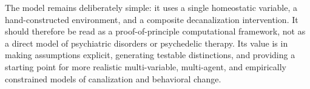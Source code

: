 The model remains deliberately simple: it uses a single homeostatic variable, a hand-constructed environment, and a composite decanalization intervention. It should therefore be read as a proof-of-principle computational framework, not as a direct model of psychiatric disorders or psychedelic therapy. Its value is in making assumptions explicit, generating testable distinctions, and providing a starting point for more realistic multi-variable, multi-agent, and empirically constrained models of canalization and behavioral change.